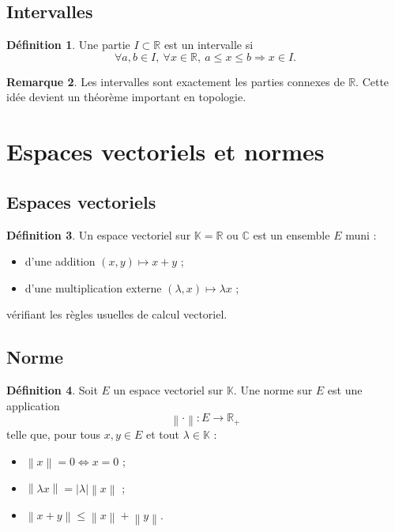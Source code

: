 \documentclass[11pt,a4paper]{article}
\theoremstyle{definition}
\newtheorem{definition}{Définition}[section]
\newtheorem{remarque}[definition]{Remarque}
\theoremstyle{plain}
\newcommand{\R}{\mathbb{R}}
\newcommand{\C}{\mathbb{C}}
\newcommand{\K}{\mathbb{K}}
\newcommand{\norme}[1]{\left\lVert #1 \right\rVert}
\begin{document}
\subsection{Intervalles}

\begin{definition}
Une partie $I\subset\R$ est un intervalle si
\[
\forall a,b\in I,\ \forall x\in\R,\ a\leq x\leq b \Rightarrow x\in I.
\]
\end{definition}

\begin{remarque}
Les intervalles sont exactement les parties connexes de $\R$. Cette idée devient un théorème important en topologie.
\end{remarque}

\section{Espaces vectoriels et normes}

\subsection{Espaces vectoriels}

\begin{definition}
Un espace vectoriel sur $\K=\R$ ou $\C$ est un ensemble $E$ muni :
\begin{itemize}
    \item d'une addition $(x,y)\mapsto x+y$ ;
    \item d'une multiplication externe $(\lambda,x)\mapsto \lambda x$ ;
\end{itemize}
vérifiant les règles usuelles de calcul vectoriel.
\end{definition}

\subsection{Norme}

\begin{definition}
Soit $E$ un espace vectoriel sur $\K$.
Une norme sur $E$ est une application
\[
\norme{\cdot}:E\to\R_+
\]
telle que, pour tous $x,y\in E$ et tout $\lambda\in\K$ :
\begin{itemize}
    \item $\norme{x}=0 \Longleftrightarrow x=0$ ;
    \item $\norme{\lambda x}=|\lambda|\norme{x}$ ;
    \item $\norme{x+y}\leq \norme{x}+\norme{y}$.
\end{itemize}
\end{definition}
\end{document}
